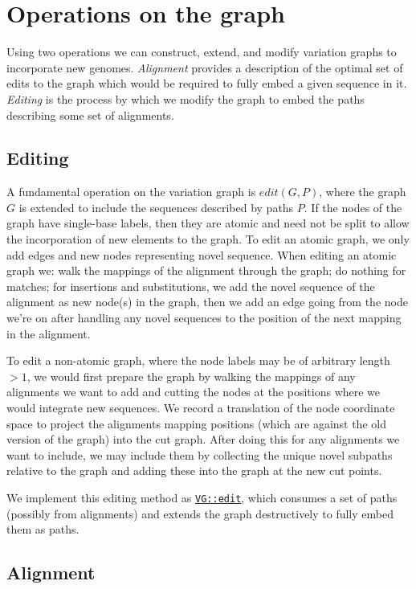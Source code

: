 \documentclass{article}
\begin{document}
\section{Operations on the graph}

Using two operations we can construct, extend, and modify variation graphs to incorporate new genomes.
\emph{Alignment} provides a description of the optimal set of edits to the graph which would be required to fully embed a given sequence in it.
\emph{Editing} is the process by which we modify the graph to embed the paths describing some set of alignments.

\subsection{Editing}

A fundamental operation on the variation graph is $edit(G, P)$, where the graph $G$ is extended to include the sequences described by paths $P$.
If the nodes of the graph have single-base labels, then they are atomic and need not be split to allow the incorporation of new elements to the graph.
To edit an atomic graph, we only add edges and new nodes representing novel sequence.
When editing an atomic graph we: walk the mappings of the alignment through the graph; do nothing for matches; for insertions and substitutions, we add the novel sequence of the alignment as new node(s) in the graph, then we add an edge going from the node we're on after handling any novel sequences to the position of the next mapping in the alignment.

To edit a non-atomic graph, where the node labels may be of arbitrary length $> 1$, we would first prepare the graph by walking the mappings of any alignments we want to add and cutting the nodes at the positions where we would integrate new sequences.
We record a translation of the node coordinate space to project the alignments mapping positions (which are against the old version of the graph) into the cut graph.
After doing this for any alignments we want to include, we may include them by collecting the unique novel subpaths relative to the graph and adding these into the graph at the new cut points.

We implement this editing method as \href{https://github.com/vgteam/vg/blob/fbcb6e62/src/vg.cpp#L4846-L4912}{{\tt VG::edit}}, which consumes a set of paths (possibly from alignments) and extends the graph destructively to fully embed them as paths.

\subsection{Alignment}
\end{document}
